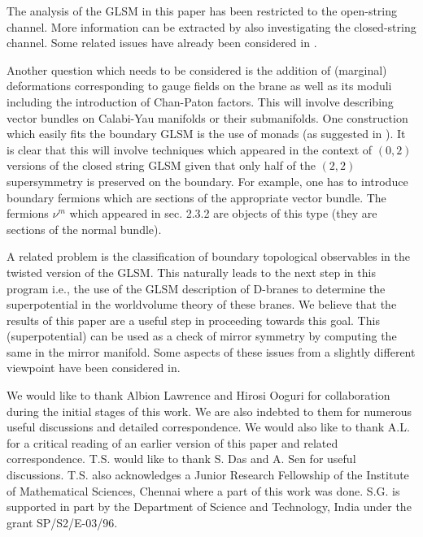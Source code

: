 \documentclass[a4paper,12pt]{article}
\begin{document}
The analysis of the GLSM in this paper
has been restricted to the open-string
channel. More information can be extracted by also investigating
the closed-string channel. Some related issues have already been 
considered in \cite{HV,HIV}. 

Another question which  needs to be
considered is the addition of (marginal) deformations corresponding to
gauge fields on the brane as well as its moduli including
the introduction of Chan-Paton factors.  This will involve describing
vector bundles on Calabi-Yau manifolds or their submanifolds. One
construction which easily fits the boundary GLSM is the use of monads
(as suggested in \cite{quintic}). It is
clear that this will involve techniques which appeared in the context of
$(0,2)$ versions of the closed string GLSM\cite{wittenphases,distler}
given that only half of the $(2,2)$ supersymmetry is preserved on the
boundary. For example, one has to introduce boundary fermions which
are sections of the appropriate vector bundle\cite{later}. The fermions $\nu^m$
which appeared in sec. 2.3.2 are objects of this type (they are sections
of the normal bundle).

A related problem
is the classification of boundary topological  observables in
the twisted version of the GLSM. This naturally leads to 
the next step in this program i.e., the use of the GLSM
description of D-branes to determine the superpotential in the
worldvolume theory of these branes. We believe that the results of this
paper are a useful step in proceeding towards this goal.  This 
(superpotential)
can be used as a check of mirror symmetry by computing the same in the
mirror manifold. Some aspects of these issues from a slightly
different viewpoint have been considered in\cite{vafamirror,ketal,kklm2}.
\bigskip

 We would like to thank
Albion Lawrence and Hirosi Ooguri for collaboration during the initial 
stages of this work.
We are also indebted to them for numerous useful discussions and detailed
correspondence. We would also like to thank A.L. for a critical reading
of an earlier version of this paper and related correspondence. 
T.S. would like to thank S. Das and A. Sen for useful discussions. 
T.S. also acknowledges a Junior Research Fellowship of the 
Institute of Mathematical Sciences, Chennai where a part of this
work was done.  S.G. is supported in part by the Department of Science 
and Technology, India under the grant SP/S2/E-03/96.
\end{document}
